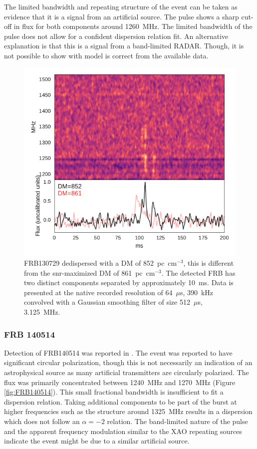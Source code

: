 \documentclass[a4paper,fleqn,usenatbib]{mnras}
\begin{document}
The limited bandwidth and repeating structure of the event can be taken as
evidence that it is a signal from an artificial source. The pulse shows a sharp
cut-off in flux for both components around 1260~MHz. The limited bandwidth of
the pulse does not allow for a confident dispersion relation fit. An alternative
explanation is that this is a signal from a band-limited RADAR. Though, it is
not possible to show with model is correct from the available data.

\begin{figure}
    \includegraphics[width=1.0\linewidth]{figures/FRB130729.pdf}
    \caption{FRB130729 dedispersed with a DM of 852~pc~cm$^{-3}$, this is
    different from the \gls{snr}-maximized DM of 861~pc~cm$^{-3}$.  The detected
    FRB has two distinct components separated by approximately 10~ms. Data is
    presented at the native recorded resolution of 64~$\mu$s, 390~kHz convolved
    with a Gaussian smoothing filter of size 512~$\mu$s, 3.125~MHz.
    }
    \label{fig:FRB130729}
\end{figure}

\subsubsection{FRB 140514}

Detection of FRB140514 was reported in \citep{2015MNRAS.447..246P}.  The event
was reported to have significant circular polarization, though this is not
necessarily an indication of an astrophysical source as many artificial
transmitters are circularly polarized.  The flux was primarily concentrated
between 1240~MHz and 1270~MHz (Figure \ref{fig:FRB140514}). This small
fractional bandwidth is insufficient to fit a dispersion relation. Taking
additional components to be part of the burst at higher frequencies such as the
structure around 1325~MHz results in a dispersion which does not follow an
$\alpha=-2$ relation. The band-limited nature of the pulse and the apparent
frequency modulation similar to the XAO repeating sources indicate the event
might be due to a similar artificial source. 
\end{document}
